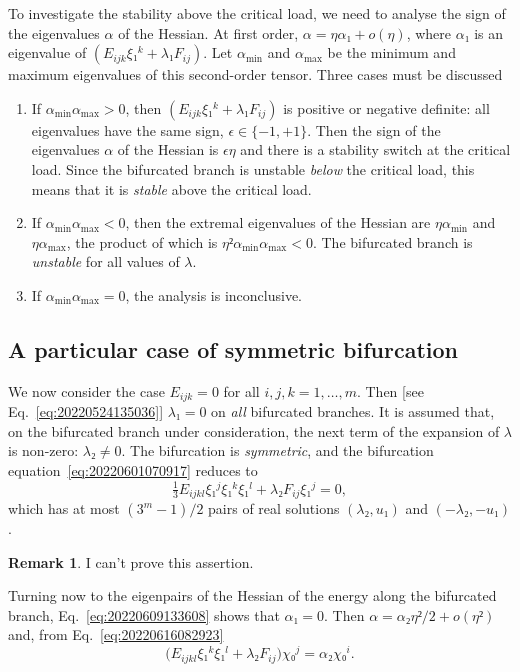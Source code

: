 \documentclass[12pt, final]{scrartcl}
\theoremstyle{definition}
\newtheorem{remark}{Remark}
\begin{document}
To investigate the stability above the critical load, we need to analyse the
sign of the eigenvalues \(α\) of the Hessian. At first order,
\(α = η α₁ + o(η)\), where \(α₁\) is an eigenvalue of
\((E_{ijk} ξ₁^k + λ₁ F_{ij})\). Let \(α_{\min}\) and \(α_{\max}\) be the minimum
and maximum eigenvalues of this second-order tensor. Three cases must be
discussed
\begin{enumerate}
\item If \(α_{\min} α_{\max} > 0\), then \((E_{ijk} ξ₁^k + λ₁ F_{ij})\) is
  positive or negative definite: all eigenvalues have the same sign,
  \(\epsilon ∈ \{-1, +1\}\). Then the sign of the eigenvalues \(α\) of the
  Hessian is \(\epsilon η\) and there is a stability switch at the critical
  load. Since the bifurcated branch is unstable \emph{below} the critical load,
  this means that it is \emph{stable} above the critical load.
\item If \(α_{\min} α_{\max} < 0\), then the extremal eigenvalues of the Hessian
  are \(η α_{\min}\) and \(η α_{\max}\), the product of which is
  \(η² α_{\min} α_{\max} < 0\). The bifurcated branch is \emph{unstable} for all
  values of \(λ\).
\item If \(α_{\min} α_{\max} = 0\), the analysis is inconclusive.
\end{enumerate}

\subsection{A particular case of symmetric bifurcation }

We now consider the case \(E_{ijk}=0\) for all \(i, j, k = 1, \ldots, m\). Then
[see Eq.~\eqref{eq:20220524135036}] \(λ₁ = 0\) on \emph{all} bifurcated
branches. It is assumed that, on the bifurcated branch under consideration, the
next term of the expansion of \(λ\) is non-zero: \(λ₂ ≠ 0\). The bifurcation is
\emph{symmetric}, and the bifurcation equation~\eqref{eq:20220601070917} reduces
to
\begin{equation}
  \tfrac{1}{3} E_{ijkl} ξ₁^j ξ₁^k ξ₁^l  + λ₂ F_{ij} ξ₁^j = 0,
\end{equation}
which has at most \((3^m - 1) / 2\) pairs of real solutions \((λ₂, u₁)\) and
\((- λ₂, - u₁)\).

\begin{remark}
  I can't prove this assertion.
\end{remark}

Turning now to the eigenpairs of the Hessian of the energy along
the bifurcated branch, Eq.~\eqref{eq:20220609133608} shows that \(α₁ = 0\). Then
\(α = α₂ η² / 2 + o(η²)\) and, from Eq.~\eqref{eq:20220616082923}
\begin{equation}
  \bigl(E_{ijkl} ξ₁^k ξ₁^l + λ₂ F_{ij} \bigr) χ₀^j = α₂ χ₀^i.
\end{equation}
\end{document}

